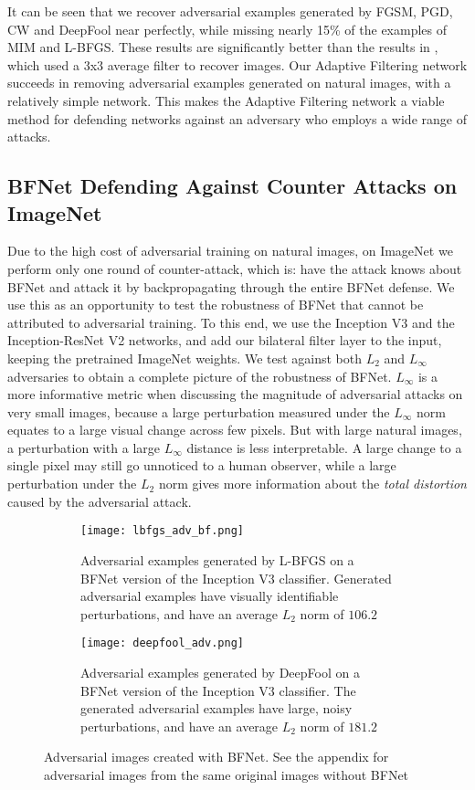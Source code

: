 \documentclass{article} %
\begin{document}
It can be seen that we recover adversarial examples generated by FGSM, PGD, CW and DeepFool near perfectly, while missing nearly 15\% of the examples of MIM and L-BFGS. These results are significantly better than the results in \citep{li2017adversarial}, which used a 3x3 average filter to recover images. Our Adaptive Filtering network succeeds in removing adversarial examples generated on natural images, with a relatively simple network. This makes the Adaptive Filtering network a viable method for defending networks against an adversary who employs a wide range of attacks.  


\subsection{BFNet Defending Against Counter Attacks on ImageNet}
Due to the high cost of adversarial training on natural images, on ImageNet we perform only one round of counter-attack, which is: have the attack knows about BFNet and attack it by backpropagating through the entire BFNet defense. We use this as an opportunity to test the robustness of BFNet that cannot be attributed to adversarial training. To this end, we use the Inception V3 and the Inception-ResNet V2 networks, and add our bilateral filter layer to the input, keeping the pretrained ImageNet weights. We test against both $L_2$ and $L_\infty$  adversaries to obtain a complete picture of the robustness of BFNet. $L_\infty$ is a more informative metric when discussing the magnitude of adversarial attacks on very small images, because a large perturbation measured under the $L_\infty$ norm equates to a large visual change across few pixels. But with large natural images, a perturbation with a large $L_\infty$ distance is less interpretable. A large change to a single pixel may still go unnoticed to a human observer, while a large perturbation under the $L_2$ norm gives more information about the \textit{total distortion} caused by the adversarial attack. 

\begin{figure}[htb]
\label{fig:l2_images}
\centering
\captionsetup[subfigure]{}
\begin{subfigure}{\textwidth}
  \centering
  \texttt{[image: lbfgs\_adv\_bf.png]}
\vskip -0.1in
  \caption{Adversarial examples generated by L-BFGS on a BFNet version of the Inception V3 classifier. Generated adversarial examples have visually identifiable perturbations, and have an average $L_2$ norm of $106.2$ }
\end{subfigure}
\vskip -0.03in
\begin{subfigure}{\textwidth}
  \centering
  \texttt{[image: deepfool\_adv.png]}
\vskip -0.1in
  \caption{Adversarial examples generated by DeepFool on a BFNet version of the Inception V3 classifier. The generated adversarial examples have large, noisy perturbations, and have an average $L_2$ norm of $181.2$ }
\end{subfigure}
\vskip -0.08in
\caption{ Adversarial images created with BFNet. See the appendix for adversarial images from the same original images without BFNet}
\label{fig:bfnet_imagenet}
\vskip -0.1in
\end{figure}
\end{document}
